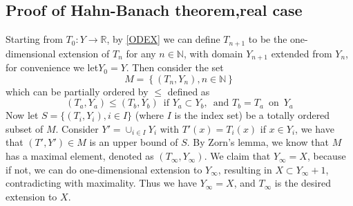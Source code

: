 \subsection{Proof of Hahn-Banach theorem,real case}
Starting from $T_0:Y\xrightarrow{}\mathbb{R}$, by \ref{ODEX} we can define  $T_{n+1}$ to be the one-dimensional extension of $T_n$ for any $n\in\mathbb{N}$, with domain $Y_{n+1}$ extended from $Y_n$, for convenience we let$Y_0=Y$.
Then consider the set
$$
	M=
	\left\{
	(T_n,Y_n),n\in\mathbb{N}
	\right\}
$$
which can be partially ordered by $\leq$ defined as
$$
	(T_a,Y_a)\leq(T_b,Y_b)\,\text{ if } Y_a\subset Y_b,\,\text{ and } T_b=T_a\, \text{ on }\, Y_a
$$
Now let $S=\{(T_i,Y_i),i\in I\}$ (where $I$ is the index set) be a totally ordered subset of $M$. Consider $Y'=\cup_{i\in I}Y_i$ with $T'(x)=T_i(x)$ if $x\in Y_i$, we have that $(T',Y')\in M$ is an upper bound of $S$. By Zorn's lemma, we know that $M$ has a maximal element, denoted as $(T_\infty,Y_\infty)$. We claim that $Y_\infty=X$, because if not, we can do one-dimensional extension to $Y_\infty$, resulting in $X\subset Y_\infty+1$, contradicting with maximality. Thus we have $Y_\infty=X$, and  $T_\infty$ is the desired extension to $X$.

